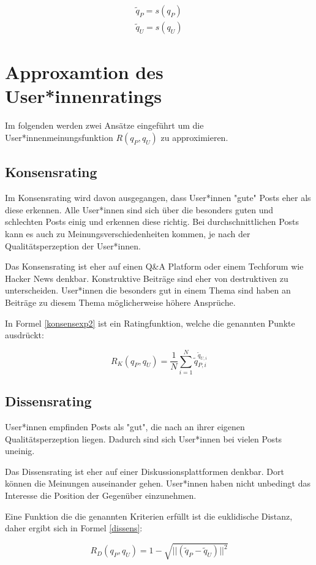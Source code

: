 \begin{align}
\tilde{q}_P = s(q_P) \\
\tilde{q}_U = s(q_U) 
\end{align}

\section{Approxamtion des User*innenratings}

Im folgenden werden zwei Ansätze eingeführt um die User*innenmeinungsfunktion $R(q_P,q_U)$ zu approximieren.
 
\subsection{Konsensrating}

Im Konsensrating wird davon ausgegangen, dass User*innen "gute" Posts eher als diese erkennen. Alle User*innen sind sich über die besonders guten und schlechten Posts einig und erkennen diese richtig. Bei durchschnittlichen Posts kann es auch zu Meinungsverschiedenheiten kommen, je nach der Qualitätsperzeption der User*innen.

Das Konsensrating ist eher auf einen Q\&A Platform oder einem Techforum wie Hacker News denkbar. Konstruktive Beiträge sind eher von destruktiven zu unterscheiden. User*innen die besonders gut in einem Thema sind haben an Beiträge zu diesem Thema möglicherweise höhere Ansprüche.


In Formel \ref{konsensexp2} ist ein Ratingfunktion, welche die genannten Punkte ausdrückt:

\begin{equation}
\label{konsensexp2}
R_K(q_P,q_U) = \frac{1}{N}\sum_{i = 1}^{N}\tilde{q}_{P,i}^{\tilde{q}_{U,i}}
\end{equation}



\subsection{Dissensrating}

User*innen empfinden Posts als "gut", die nach an ihrer eigenen Qualitätsperzeption liegen. Dadurch sind sich User*innen bei vielen Posts uneinig.

Das Dissensrating ist eher auf einer Diskussionsplattformen denkbar. Dort können die Meinungen auseinander gehen. User*innen haben nicht unbedingt das Interesse die Position der Gegenüber einzunehmen. 

Eine Funktion die die genannten Kriterien erfüllt ist die euklidische Distanz, daher ergibt sich in Formel \ref{dissens}:


\begin{equation}
\label{dissens}
R_D(q_P,q_U) = 1 - \sqrt{||(\tilde{q}_P - \tilde{q}_U)||^2}
\end{equation}
